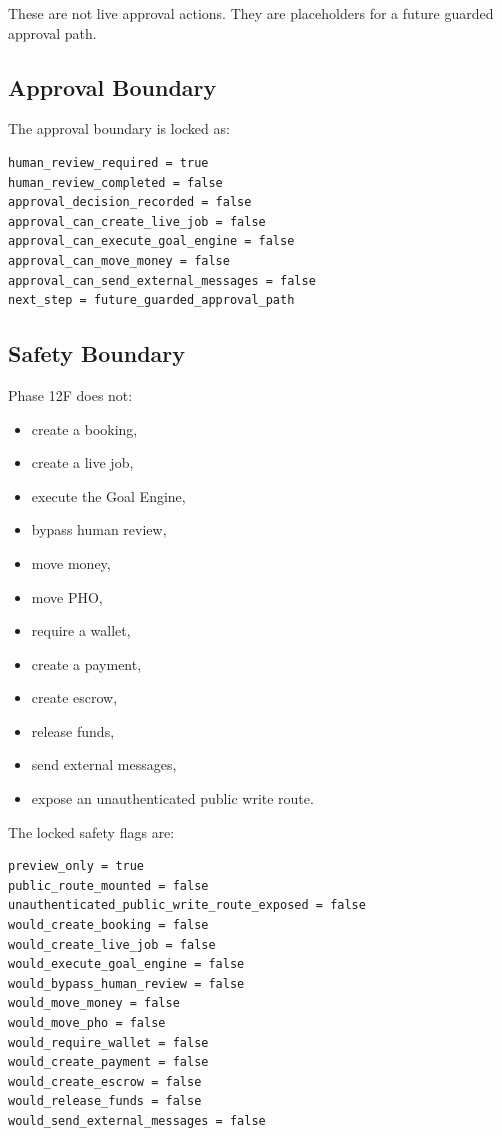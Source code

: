 These are not live approval actions. They are placeholders for a future guarded approval path.

\subsection{Approval Boundary}

The approval boundary is locked as:

\begin{verbatim}
human_review_required = true
human_review_completed = false
approval_decision_recorded = false
approval_can_create_live_job = false
approval_can_execute_goal_engine = false
approval_can_move_money = false
approval_can_send_external_messages = false
next_step = future_guarded_approval_path
\end{verbatim}

\subsection{Safety Boundary}

Phase 12F does not:

\begin{itemize}
  \item create a booking,
  \item create a live job,
  \item execute the Goal Engine,
  \item bypass human review,
  \item move money,
  \item move PHO,
  \item require a wallet,
  \item create a payment,
  \item create escrow,
  \item release funds,
  \item send external messages,
  \item expose an unauthenticated public write route.
\end{itemize}

The locked safety flags are:

\begin{verbatim}
preview_only = true
public_route_mounted = false
unauthenticated_public_write_route_exposed = false
would_create_booking = false
would_create_live_job = false
would_execute_goal_engine = false
would_bypass_human_review = false
would_move_money = false
would_move_pho = false
would_require_wallet = false
would_create_payment = false
would_create_escrow = false
would_release_funds = false
would_send_external_messages = false
\end{verbatim}


